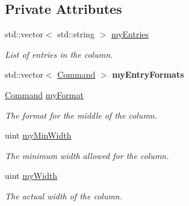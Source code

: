 \subsection*{Private Attributes}
\begin{DoxyCompactItemize}
\item 
\hypertarget{class_t_c_o_m_1_1_column_ad0e80fb1284facb91b901c05dda05d54}{std\-::vector$<$ std\-::string $>$ \hyperlink{class_t_c_o_m_1_1_column_ad0e80fb1284facb91b901c05dda05d54}{my\-Entries}}\label{class_t_c_o_m_1_1_column_ad0e80fb1284facb91b901c05dda05d54}

\begin{DoxyCompactList}\small\item\em List of entries in the column. \end{DoxyCompactList}\item 
\hypertarget{class_t_c_o_m_1_1_column_ade33cc0898405fb6d0e6588aac14c44b}{std\-::vector$<$ \hyperlink{class_t_c_o_m_1_1_command}{Command} $>$ {\bfseries my\-Entry\-Formats}}\label{class_t_c_o_m_1_1_column_ade33cc0898405fb6d0e6588aac14c44b}

\item 
\hypertarget{class_t_c_o_m_1_1_column_a43670fe906df19fd733c8be6eb48dfdb}{\hyperlink{class_t_c_o_m_1_1_command}{Command} \hyperlink{class_t_c_o_m_1_1_column_a43670fe906df19fd733c8be6eb48dfdb}{my\-Format}}\label{class_t_c_o_m_1_1_column_a43670fe906df19fd733c8be6eb48dfdb}

\begin{DoxyCompactList}\small\item\em The format for the middle of the column. \end{DoxyCompactList}\item 
\hypertarget{class_t_c_o_m_1_1_column_af48f518de3de200c5d8e5e6cc3525bdd}{uint \hyperlink{class_t_c_o_m_1_1_column_af48f518de3de200c5d8e5e6cc3525bdd}{my\-Min\-Width}}\label{class_t_c_o_m_1_1_column_af48f518de3de200c5d8e5e6cc3525bdd}

\begin{DoxyCompactList}\small\item\em The minimum width allowed for the column. \end{DoxyCompactList}\item 
\hypertarget{class_t_c_o_m_1_1_column_ac523335f2293ddc45b64ff0eedffe556}{uint \hyperlink{class_t_c_o_m_1_1_column_ac523335f2293ddc45b64ff0eedffe556}{my\-Width}}\label{class_t_c_o_m_1_1_column_ac523335f2293ddc45b64ff0eedffe556}

\begin{DoxyCompactList}\small\item\em The actual width of the column. \end{DoxyCompactList}\end{DoxyCompactItemize}
